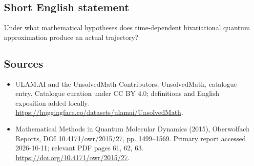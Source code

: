 \documentclass[11pt]{article}
\begin{document}
\subsection{Short English statement}
Under what mathematical hypotheses does time-dependent bivariational quantum approximation produce an actual trajectory?
\subsection{Sources}
\begin{itemize}
\item[\hypertarget{source:statement:1}{S1}] ULAM.AI and the UnsolvedMath Contributors, UnsolvedMath, catalogue entry. Catalogue curation under CC BY 4.0; definitions and English exposition added locally.
\url{https://huggingface.co/datasets/ulamai/UnsolvedMath}.
\item[\hypertarget{source:statement:2}{S2}] Mathematical Methods in Quantum Molecular Dynamics (2015), Oberwolfach Reports, DOI 10.4171/owr/2015/27, pp. 1499--1569. Primary report accessed 2026-10-11; relevant PDF pages 61, 62, 63.
\url{https://doi.org/10.4171/owr/2015/27}.
\end{itemize}
\label{end:statement}
\end{document}
